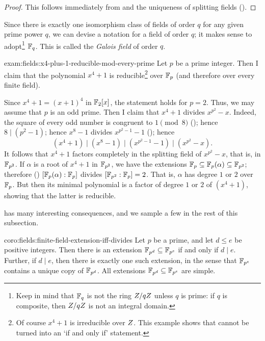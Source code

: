 \begin{proof}
  This follows immediately from  and the
  uniqueness of splitting fields ().
\end{proof}
Since there is exactly one isomorphism class of fields of order $q$
for any given prime power $q$, we can devise a notation for a field of
order $q$; it makes sense to adopt\footnote{Keep in mind that $\mathbb{F}_q$
  is not the ring $Z/qZ$ unless $q$ is prime: if $q$ is composite,
  then $Z/qZ$ is not an integral domain.}  $\mathbb{F}_q$. This is called
the \emph{Galois field} of order $q$.
\begin{exam}{}{exam:fields:x4-plus-1-reducible-mod-every-prime}
  Let $p$ be a prime integer. Then I claim that the polynomial
  $x^4 + 1$ is reducible\footnote{Of course $x^4 + 1$ is irreducible
    over $Z$. This example shows that  cannot
    be turned into an `if and only if' statement.} over $\mathbb{F}_p$ (and
  therefore over every finite field).

  Since $x^4 + 1 = (x+1)^4$ in $\mathbb{F}_2[x]$, the statement holds for
  $p = 2$. Thus, we may assume that $p$ is an odd prime. Then I claim
  that $x^4 + 1$ divides $x^{p^2} - x$. Indeed, the square of every
  odd number is congruent to $1 \pmod{8}$
  (); hence $8 \mid (p^2-1)$; hence
  $x^8 - 1$ divides $x^{p^2-1} - 1$
  (); hence
  \[
    (x^4+1) \mid (x^8-1) \mid (x^{p^2-1}-1) \mid (x^{p^2}-x).
  \]
  It follows that $x^4 + 1$ factors completely in the splitting field
  of $x^{p^2} - x$, that is, in $\mathbb{F}_{p^2}$. If $\alpha$ is a root of
  $x^4 + 1$ in $\mathbb{F}_{p^2}$, we have the extensions
  $\mathbb{F}_p \subseteq \mathbb{F}_p(\alpha) \subseteq \mathbb{F}_{p^2}$; therefore
  () $[\mathbb{F}_p(\alpha) : \mathbb{F}_p]$ divides
  $[\mathbb{F}_{p^2} : \mathbb{F}_p] = 2$. That is, $\alpha$ has degree $1$ or $2$
  over $\mathbb{F}_p$. But then its minimal polynomial is a factor of degree
  $1$ or $2$ of $(x^4+1)$, showing that the latter is reducible.
\end{exam}
 has many interesting consequences, and we sample
a few in the rest of this subsection.
\begin{coro}{}{coro:fields:finite-field-extension-iff-divides}
  Let $p$ be a prime, and let $d \leq e$ be positive integers. Then
  there is an extension $\mathbb{F}_{p^d} \subseteq \mathbb{F}_{p^e}$ if and only if
  $d \mid e$. Further, if $d \mid e$, then there is exactly one such
  extension, in the sense that $\mathbb{F}_{p^e}$ contains a unique copy of
  $\mathbb{F}_{p^d}$. All extensions $\mathbb{F}_{p^d} \subseteq \mathbb{F}_{p^e}$ are simple.
\end{coro}
